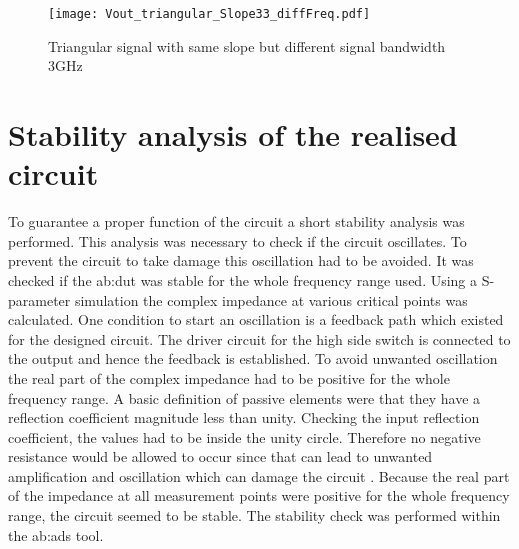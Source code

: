 \begin{figure}[htb!]
	\centering
  \texttt{[image: Vout\_triangular\_Slope33\_diffFreq.pdf]}
	\caption{Triangular signal with same slope but different signal bandwidth 3GHz}
	\label{fig:DiffSigBWSameSlopeTriangular}
\end{figure}


\section{Stability analysis of the realised circuit}
To guarantee a proper function of the circuit a short stability analysis was performed.
This analysis was necessary to check if the circuit oscillates.
To prevent the circuit to take damage this oscillation had to be avoided.
It was checked if the \gls{ab:dut} was stable for the whole frequency range used.
Using a S-parameter simulation the complex impedance at various critical points was calculated.
One condition to start an oscillation is a feedback path which existed for the designed circuit.
The driver circuit for the high side switch is connected to the output and hence the feedback is established.
To avoid unwanted oscillation the real part of the complex impedance had to be positive for the whole frequency range.
A basic definition of passive elements were that they have a reflection coefficient magnitude less than unity.
Checking the input reflection coefficient, the values had to be inside the unity circle.
Therefore no negative resistance would be allowed to occur since that can lead to unwanted amplification and oscillation which can damage the circuit \cite{GilmoreR.2003}.
Because the real part of the impedance at all measurement points were positive for the whole frequency range, the circuit seemed to be stable.
The stability check was performed within the \gls{ab:ads} tool. 


